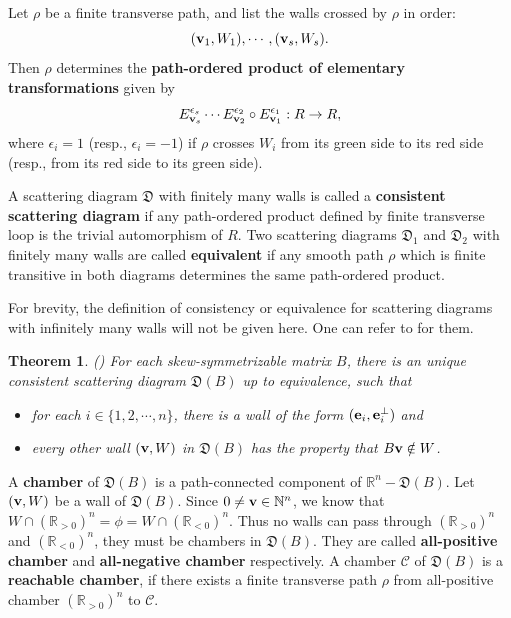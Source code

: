 \documentclass[14pt]{amsart}
\newtheorem{Theorem}{Theorem}[section]
\begin{document}
Let $\rho$ be a finite transverse path, and list the walls
crossed by $\rho$ in order: $$({\bf v}_1, W_1),\cdots,({\bf v}_s, W_s).$$  Then $\rho$ determines
the {\bf path-ordered product of elementary transformations} given by
$$E_{{\bf v}_s}^{\epsilon_s}\cdots  E_{{\bf v}_2}^{\epsilon_2}\circ E_{{\bf v}_1}^{\epsilon_1}:R\rightarrow R,$$
where $\epsilon_i=1$ (resp.,  $\epsilon_i=-1$) if $\rho$ crosses $W_i$ from its green side to its red side (resp., from its red side to its green
side).


  A scattering diagram  $\mathfrak D$ with finitely many walls is called a {\bf consistent scattering diagram}  if any path-ordered product defined by finite transverse loop is the trivial automorphism of $R$.
Two scattering diagrams $\mathfrak D_1$ and $\mathfrak D_2$ with finitely many walls are called {\bf equivalent}  if any smooth path $\rho$ which is finite transitive in both  diagrams
determines the same path-ordered product.

For brevity, the definition of  consistency or equivalence for scattering diagrams with infinitely many walls will not be given here. One can refer to \cite{M} for them.

\begin{Theorem}(\cite[Theorem 1.12]{GHKK})
For each  skew-symmetrizable matrix $B$, there is an unique consistent scattering diagram
$\mathfrak D(B)$  up to equivalence, such that
\begin{itemize}
\item for each $i\in\{1,2,\cdots,n\}$, there is a wall of the form $({\bf e}_i,{\bf e}_i^{\bot})$ and
\item every other wall $({\bf v}, W)$ in $\mathfrak D(B)$ has the property that $B{\bf v}\notin W$.
\end{itemize}
\end{Theorem}


A {\bf chamber} of $\mathfrak D(B)$ is  a path-connected
component of $\mathbb R^n-\mathfrak D(B)$. Let $({\bf v}, W)$ be a wall of $\mathfrak D(B)$.
Since $0\neq {\bf v}\in \mathbb N^n$, we know that $W\cap(\mathbb R_{>0})^n=\phi=W\cap(\mathbb R_{<0})^n$.
Thus no walls can pass through $(\mathbb R_{>0})^n$ and $(\mathbb R_{<0})^n$, they must be chambers in $\mathfrak D(B)$. They are called {\bf all-positive chamber} and {\bf all-negative chamber} respectively.
 A chamber $\mathcal C$ of   $\mathfrak D(B)$ is a {\bf reachable chamber}, if there exists a finite
transverse path $\rho$ from all-positive chamber $(\mathbb R_{>0})^n$ to $\mathcal C$.
\end{document}
